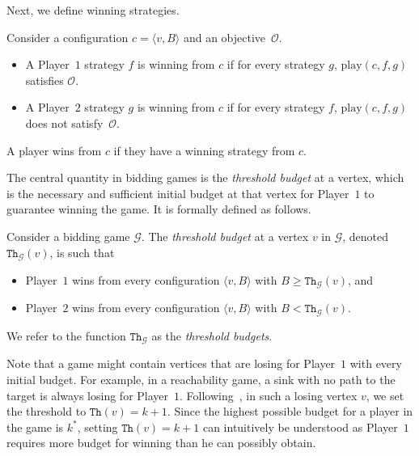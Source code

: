 \documentclass{article}\providecommand{\nequiv}{\not\equiv}\usepackage[a4paper,margin=20mm]{geometry}
\newcommand{\PO}{Player~$1$\xspace}
\newcommand{\PT}{Player~$2$\xspace}
\newcommand{\G}{{\mathcal G}}
\newcommand{\thresh}{\texttt{Th}\xspace}
\newcommand{\play}{\text{play}\xspace}
\newcommand{\zug}[1]{\langle #1  \rangle}
\newcommand{\Obj}{\mathcal{O}}
\begin{document}
Next, we define winning strategies.
\begin{definition}
Consider a configuration $c = \zug{v, B}$ and an objective~\(\Obj\).
\begin{itemize}
\item A \PO strategy $f$ is winning from \(c\) if for every strategy $g$, $\play(c, f, g)$ satisfies \(\Obj\). 
\item A \PT strategy \(g\) is winning from \(c\) if for every strategy \(f\), \(\play(c, f, g)\) does not satisfy~\(\Obj\). 
\end{itemize}
A player wins from \(c\) if they have a winning strategy from \(c\).
\end{definition}


The central quantity in bidding games is the {\em threshold budget} at a vertex, which is the necessary and sufficient initial budget at that vertex for \PO to guarantee winning the game. It is formally defined as follows.

\begin{definition} Consider a bidding game $\G$. The {\em threshold budget} at a vertex $v$ in $\G$, denoted $\thresh_\G(v)$, is such that 
\begin{itemize}
\item \PO wins from every configuration $\zug{v, B}$ with $B \geq \thresh_\G(v)$, and 
\item \PT wins from every configuration $\zug{v, B}$ with $B < \thresh_\G(v)$.
\end{itemize}
We refer to the function $\thresh_\G$ as the {\em threshold budgets}. 
\end{definition}


\begin{remark}
\label{rem:losing-vertices}
Note that a game might contain vertices that are losing for \PO with every initial budget. For example, in a reachability game, a sink with no path to the target is always losing for \PO. Following~\cite{DP10}, in such a losing vertex $v$, we set the threshold to $\thresh(v) = k+1$. Since the highest possible budget for a player in the game is $k^*$, setting $\thresh(v) = k+1$ can intuitively be understood as \PO requires more budget for winning than he can possibly obtain.  
\end{remark}
   
\end{document}
